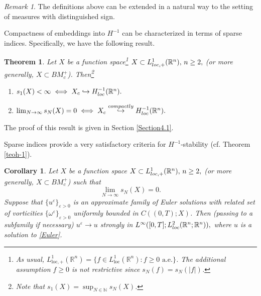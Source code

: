 \documentclass[11pt, a4paper,leqno]{amsart}
\newtheorem{theorem}{Theorem}
\theoremstyle{plain}
\newtheorem{corollary}{Corollary}
\numberwithin{equation}{section}
\theoremstyle{definition}
\theoremstyle{remark}
\newtheorem{remark}{Remark}
\def\R{\mathbb{R}}
\begin{document}
\begin{remark}
	The  definitions above can be extended in a natural way  to the setting of measures with distinguished sign.
\end{remark}

Compactness of embeddings into $H^{-1}$ can be characterized in terms of sparse indices. Specifically, we have the following result. 





\begin{theorem}\label{teo:compacto}
Let $X$ be a function space\footnote{As usual, $ L^1_{\text{loc}, +}(\R^n) = \{f \in  L^1_{\text{loc}}(\R^n) : f \geq 0 \text{ a.e.}\}$. The additional assumption $f \geq 0$ is not restrictive  since $s_N(f) = s_N(|f|)$.} $X\subset L_{\emph{loc}, +}%
^{1}(\mathbb{R}^{n}), \, n \geq 2,$ (or more generally, $X \subset BM^+_c$). Then\footnote{Note that $s_1(X) = \sup_{N \in \mathbb{N}} s_N(X)$.}
\begin{enumerate}
\item[(i)] $s_1(X)<\infty\iff X_{c}\hookrightarrow H_{\emph{loc}}^{-1}(\R^n).$
\item[(ii)] $
\lim_{N\rightarrow\infty}s_{N}(X)=0 \iff X_{c}\overset{compactly}{\hookrightarrow}H_{\emph{loc}}^{-1}(\R^n).$
\end{enumerate}
\end{theorem}

The proof of this result is given in Section \ref{Section4.1}. 

Sparse indices provide a very satisfactory criteria for $H^{-1}$-stability (cf. Theorem \ref{teoh-1}). 

\begin{corollary}\label{Corollary1}
	Let $X$ be a function space $X\subset L_{\emph{loc}, +}%
^{1}(\mathbb{R}^{n}), \, n \geq 2,$ (or more generally, $X \subset BM^+_c$) such that
\begin{equation}\label{LimitZero}
	\lim_{N\rightarrow\infty}s_{N}(X)=0. 
\end{equation}
 Suppose that $\{u^{\varepsilon}\}_{\varepsilon>0}$ is an approximate family of Euler solutions with related set of vorticities $\{\omega^\varepsilon\}_{\varepsilon > 0}$ uniformly bounded in $C((0, T); X)$. Then (passing to a subfamily if necessary) $u^{\varepsilon} \to u$ strongly in $L^{\infty
}([0,T];L_{\emph{loc}}^{2}(\mathbb{R}^{n};\mathbb{R}^{n})),$  where  $u$ is a solution to \eqref{Euler}.
\end{corollary}
\end{document}

